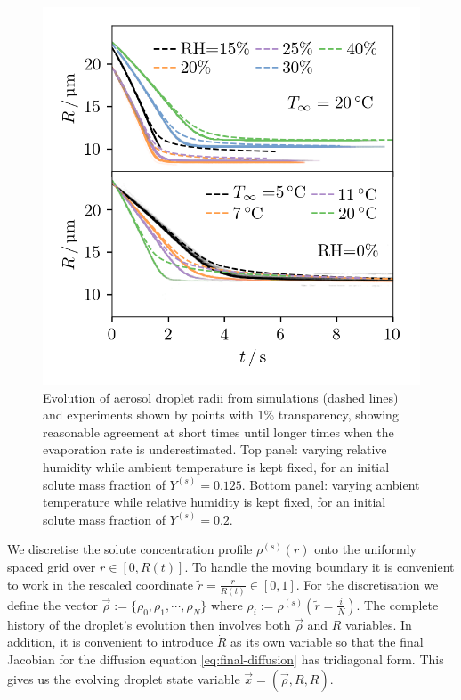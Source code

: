 \documentclass[11pt,twoside]{report}
\begin{document}
\begin{figure}
  \includegraphics[width=0.9\linewidth,outer]{nano3-trajectory}
  \caption[Evolution of drying droplet radii]{
    Evolution of  aerosol droplet radii from simulations (dashed lines) and experiments shown by points with 1\% transparency, showing reasonable agreement at short times until longer times when the evaporation rate is underestimated.
    Top panel: varying relative humidity while ambient temperature is kept fixed, for an initial solute mass fraction of $Y^{(s)} = 0.125$.
    Bottom panel: varying ambient temperature while relative humidity is kept fixed, for an initial solute mass fraction of $Y^{(s)} = 0.2$.}
  \label{fig:nano3-trajectory}
\end{figure}

We discretise the solute concentration profile $\rho^{(s)}(r)$ onto the uniformly spaced grid over $r \in [0, R(t)]$.
To handle the moving boundary it is convenient to work in the rescaled coordinate $\tilde{r} = \frac{r}{R(t)} \in [0, 1]$.
For the discretisation we define the vector $\vec{\rho} := \{\rho_0, \rho_1, \cdots, \rho_N\}$ where $\rho_i := \rho^{(s)}\left(\tilde{r} = \frac{i}{N}\right)$.
The complete history of the droplet's evolution then involves both $\vec{\rho}$ and $R$ variables.
In addition, it is convenient to introduce $\dot{R}$ as its own variable so that the final Jacobian for the diffusion equation \eqref{eq:final-diffusion} has tridiagonal form.
This gives us the evolving droplet state variable $\vec{x} = (\vec{\rho}, R, \dot{R})$.
\end{document}
